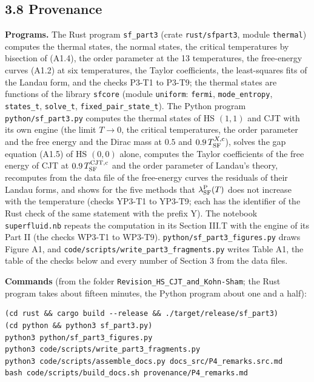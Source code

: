 \documentclass[
  10pt,
]{article}
\begin{document}
\hypertarget{provenance-1}{%
\subsection{3.8 Provenance}\label{provenance-1}}

\textbf{Programs.} The Rust program \texttt{sf\_part3} (crate
\texttt{rust/sfpart3}, module \texttt{thermal}) computes the thermal
states, the normal states, the critical temperatures by bisection of
(A1.4), the order parameter at the 13 temperatures, the free-energy
curves (A1.2) at six temperatures, the Taylor coefficients, the
least-squares fits of the Landau form, and the checks P3-T1 to P3-T9;
the thermal states are functions of the library \texttt{sfcore} (module
\texttt{uniform}: \texttt{fermi}, \texttt{mode\_entropy},
\texttt{states\_t}, \texttt{solve\_t}, \texttt{fixed\_pair\_state\_t}).
The Python program \texttt{python/sf\_part3.py} computes the thermal
states of HS \((1,1)\) and CJT with its own engine (the limit \(T\to0\),
the critical temperatures, the order parameter and the free energy and
the Dirac mass at \(0.5\) and \(0.9\,T^{X,{\rm c}}_{\rm SF}\)), solves
the gap equation (A1.5) of HS \((0,0)\) alone, computes the Taylor
coefficients of the free energy of CJT at
\(0.9\,T^{\rm CJT,c}_{\rm SF}\) and the order parameter of Landau's
theory, recomputes from the data file of the free-energy curves the
residuals of their Landau forms, and shows for the five methods that
\(\lambda^{\rm P}_{\rm SF}(T)\) does not increase with the temperature
(checks YP3-T1 to YP3-T9; each has the identifier of the Rust check of
the same statement with the prefix Y). The notebook
\texttt{superfluid.nb} repeats the computation in its Section III.T with
the engine of its Part II (the checks WP3-T1 to WP3-T9).
\texttt{python/sf\_part3\_figures.py} draws Figure A1, and
\texttt{code/scripts/write\_part3\_fragments.py} writes Table A1, the
table of the checks below and every number of Section 3 from the data
files.

\textbf{Commands} (from the folder
\texttt{Revision\_HS\_CJT\_and\_Kohn-Sham}; the Rust program takes about
fifteen minutes, the Python program about one and a half):

\begin{verbatim}
(cd rust && cargo build --release && ./target/release/sf_part3)
(cd python && python3 sf_part3.py)
python3 python/sf_part3_figures.py
python3 code/scripts/write_part3_fragments.py
python3 code/scripts/assemble_docs.py docs_src/P4_remarks.src.md
bash code/scripts/build_docs.sh provenance/P4_remarks.md
\end{verbatim}
\end{document}
